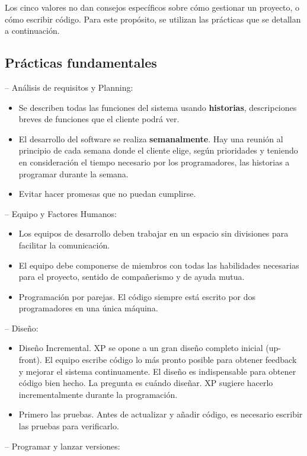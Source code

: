 Los cinco valores no dan consejos específicos sobre cómo gestionar un proyecto, o cómo
escribir código. Para este propósito, se utilizan las prácticas que se detallan a continuación.


\subsection{Prácticas fundamentales}
– Análisis de requisitos y Planning:
\begin{itemize}
\item Se describen todas las funciones del sistema usando \textbf{historias}, descripciones breves de funciones que el cliente podrá ver.
\item El desarrollo del software se realiza \textbf{semanalmente}. Hay una reunión al principio de cada semana donde el cliente elige, según prioridades y teniendo en consideración el tiempo necesario por los programadores, las historias a programar durante la semana.
\item Evitar hacer promesas que no puedan cumplirse. 
\end{itemize}
– Equipo y Factores Humanos:
\begin{itemize}
\item Los equipos de desarrollo deben trabajar en un espacio sin divisiones para facilitar la comunicación.
\item El equipo debe componerse de miembros con todas las habilidades necesarias para el proyecto, sentido de compañerismo y de ayuda mutua. 
\item Programación por parejas. El código siempre está escrito por dos programadores en una única máquina.
\end{itemize}
– Diseño:
\begin{itemize}
\item Diseño Incremental. XP se opone a un gran diseño completo inicial (up-front). El equipo escribe código lo más pronto posible para obtener feedback y mejorar el sistema continuamente. El diseño es indispensable para obtener código bien hecho. La pregunta es cuándo diseñar. XP sugiere hacerlo incrementalmente durante la programación.
\item Primero las pruebas. Antes de actualizar y añadir código, es necesario escribir las pruebas para verificarlo. 
\end{itemize}
– Programar y lanzar versiones:
